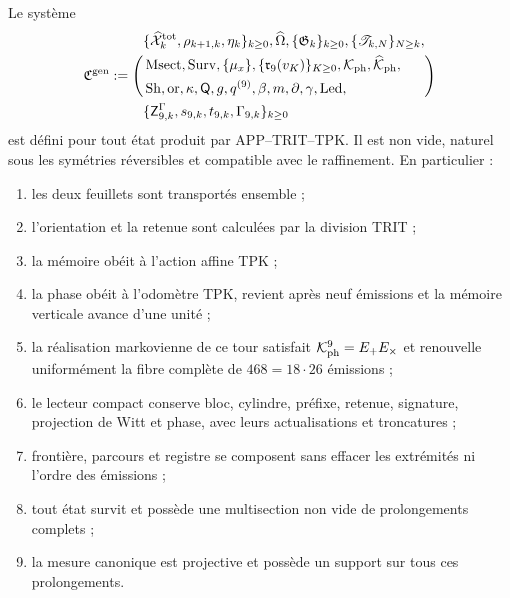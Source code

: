 \begin{theorem}
\label{thm:continuo-comun-propietario}
Le système
\begin{equation}
\label{eq:continuo-comun-propietario}
 \mathfrak C^{\rm gen}:=\Biggl(
 \begin{aligned}
 &\{\widehat{\mathcal X}^{\rm tot}_k,\rho_{k+1,k},\eta_k\}_{k\geq0},
   \widehat\Omega,\{\mathfrak G_k\}_{k\geq0},
   \{\mathscr T_{k,N}\}_{N\geq k},\\
 &\operatorname{Msect},\operatorname{Surv},\{\mu_x\},
   \{\mathfrak r_9(v_K)\}_{K\geq0},
   \mathcal K_{\rm ph},\widehat{\mathcal K}_{\rm ph},\\
 &\operatorname{Sh},\operatorname{or},\kappa,
   \mathsf Q,g,q^{(9)},\beta,m,\partial,\gamma,\operatorname{Led},\\
 &\{\mathsf Z^\Gamma_{9,k},s_{9,k},t_{9,k},\Gamma_{9,k}\}_{k\geq0}
 \end{aligned}
 \Biggr)
\end{equation}
est défini pour tout état produit par APP--TRIT--TPK\@. Il est non vide, naturel sous les symétries réversibles et compatible avec le raffinement. En particulier :
\begin{enumerate}
 \item les deux feuillets sont transportés ensemble ;
 \item l'orientation et la retenue sont calculées par la division TRIT ;
 \item la mémoire obéit à l'action affine TPK ;
 \item la phase obéit à l'odomètre TPK, revient après neuf émissions et la mémoire verticale avance d'une unité ;
 \item la réalisation markovienne de ce tour satisfait \(\mathcal K_{\rm ph}^9=E_+E_\times\) et renouvelle uniformément la fibre complète de \(468=18\cdot26\) émissions ;
 \item le lecteur compact conserve bloc, cylindre, préfixe, retenue, signature, projection de Witt et phase, avec leurs actualisations et troncatures ;
 \item frontière, parcours et registre se composent sans effacer les extrémités ni l'ordre des émissions ;
 \item tout état survit et possède une multisection non vide de prolongements complets ;
 \item la mesure canonique est projective et possède un support sur tous ces prolongements.
\end{enumerate}
\end{theorem}

